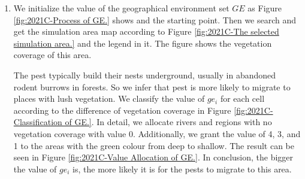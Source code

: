 \begin{enumerate}
According to the living habits of the pests that they actively appears in months from May to December when the queen start to build new nest and reproduce. Therefore, we stop simulation from January to April and restart it at the beginning of May.

As for the $i^{th}$ area, the current volume at $t+1$ moment $v^c_{i,t+1}$ depends on the number of pest population growth at $t$ moment $p_{i,t}$ and the number of migration at $t+1$ moment.
For clarity, we only calculate and explain within the range of Moore  neighborhood, that is, $i= 1,2,\dots,9$.
According to the J-curve, we know that 
    $$p_{i,t} = N_0 \times \lambda^t$$ 
where $N_0$ and $\lambda$ are constant, and
    $$\frac{p_{i,t+1}}{p_{i,t}} = \frac{N_0 \times \lambda^{t+1}}{N_0 \times \lambda^t} = \lambda$$ 
Then we have  $$p_{i,t+1} = \lambda \times p_{i,t}$$
We define the number of pest migration in central cell as depending on its current volume and the geographical environment of its eight neighbors.
    \begin{equation*}
        \label{equ:transition rule}
        m_{1,t} = \frac{ge_k}{ge_k+4} \times v^c_{1,t}, 
    \end{equation*}
where $ge_k = max \{ ge_i \} (i=2, 3, \dots, 9)$ is the maximum of the $ge$ of the neighbor cells.
In all, we achieve the transition rule that is 
    $$v^c_{1,t+1} = \lambda \times p_{1,t} + m_{1,t}.$$
\vspace{-0.6cm}
\item
We initialize the value of the geographical environment set $GE$ as Figure \ref{fig:2021C-Process of GE.} shows and the starting point. Then we search and get the simulation area map according to Figure \ref{fig:2021C-The selected simulation area.} and the legend in it\parencite{GoogleMap}. The figure shows the vegetation coverage of this area.

The pest typically build their nests underground, usually in abandoned
rodent burrows in forests\parencite{attachment}. So we infer that pest is more likely to migrate to places with lush vegetation. We classify the value of $ge_i$ for each cell according to the difference of vegetation coverage in Figure \ref{fig:2021C-Classification of GE.}. In detail, we allocate rivers and regions with no vegetation coverage with value 0. Additionally, we grant the value of 4, 3, and 1 to the areas with the green colour from deep to shallow. The result can be seen in Figure \ref{fig:2021C-Value Allocation of GE.}. In conclusion, the bigger the value of $ge_i$ is, the more likely it is for the pests to migrate to this area.


\end{enumerate}

